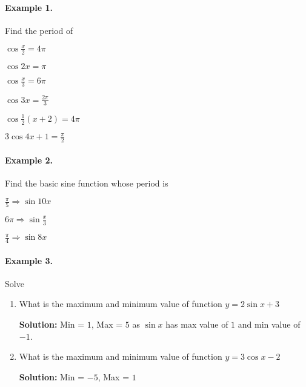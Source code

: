 \documentclass{article}
\begin{document}
\paragraph{Example 1.}

Find the period of

\begin{enumerate*}[label=\roman*)]
  \item $\cos \frac{x}{2} = 4\pi$
  \item $\cos 2x = \pi$
  \item $\cos \frac{x}{3} = 6\pi$
  \item $\cos 3x = \frac{2\pi}{3}$
  \item $\cos \frac{1}{2} (x+2) = 4\pi$
  \item $3\cos4x+1 = \frac{\pi}{2}$
\end{enumerate*}

\paragraph{Example 2.}

Find the basic sine function whose period is

\begin{enumerate*}[label=\roman*)]
  \item $\frac{\pi}{5} \Rightarrow \sin 10x$
  \item $6\pi \Rightarrow \sin \frac{x}{3}$
  \item $\frac{\pi}{4} \Rightarrow \sin 8x$
\end{enumerate*}

\paragraph{Example 3.}

Solve

\begin{enumerate}[label=\alph*)]
  \item What is the maximum and minimum value of function $y = 2\sin x + 3$

        {\scriptsize \textbf{Solution:}}
        Min = $1$, Max = $5$ as $\sin x$ has max value of $1$ and min value of $-1$.

  \item What is the maximum and minimum value of function $y = 3\cos x - 2$

        {\scriptsize \textbf{Solution:}}
        Min = $-5$, Max = $1$
\end{enumerate}
\end{document}
